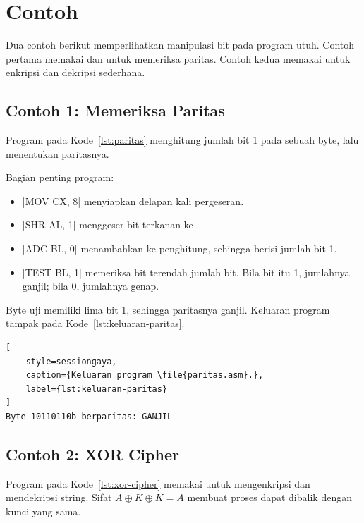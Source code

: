 \section{Contoh}
\label{sec:contoh-bab11}

Dua contoh berikut memperlihatkan manipulasi bit pada program utuh.
Contoh pertama memakai  dan  untuk memeriksa
paritas. Contoh kedua memakai  untuk enkripsi dan dekripsi
sederhana.

\subsection{Contoh 1: Memeriksa Paritas}

Program pada Kode~\ref{lst:paritas} menghitung jumlah bit 1 pada
sebuah byte, lalu menentukan paritasnya.



Bagian penting program:

\begin{itemize}
    \item \lstasm|MOV CX, 8| menyiapkan delapan kali pergeseran.
    \item \lstasm|SHR AL, 1| menggeser bit terkanan ke .
    \item \lstasm|ADC BL, 0| menambahkan  ke penghitung,
          sehingga  berisi jumlah bit 1.
    \item \lstasm|TEST BL, 1| memeriksa bit terendah jumlah bit.
          Bila bit itu 1, jumlahnya ganjil; bila 0, jumlahnya genap.
\end{itemize}

Byte uji  memiliki lima bit 1, sehingga paritasnya
ganjil. Keluaran program tampak pada
Kode~\ref{lst:keluaran-paritas}.

\begin{lstlisting}[
    style=sessiongaya,
    caption={Keluaran program \file{paritas.asm}.},
    label={lst:keluaran-paritas}
]
Byte 10110110b berparitas: GANJIL
\end{lstlisting}

\subsection{Contoh 2: XOR Cipher}

Program pada Kode~\ref{lst:xor-cipher} memakai  untuk
mengenkripsi dan mendekripsi string. Sifat $A \oplus K \oplus K = A$
membuat proses dapat dibalik dengan kunci yang sama.

